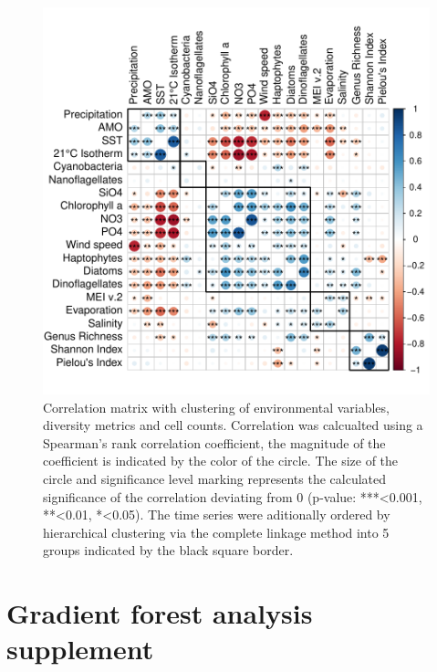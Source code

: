 \documentclass[draft]{agujournal2019}
\begin{document}
\begin{figure}[h!]
\noindent\includegraphics[width=\textwidth]{fig/CorrClustSupplementalPlot_v1.pdf}
\caption{Correlation matrix with clustering of environmental variables, diversity metrics and cell counts. Correlation was calcualted using a Spearman's rank correlation coefficient, the magnitude of the coefficient is indicated by the color of the circle. The size of the circle and significance level marking represents the calculated significance of the correlation deviating from 0 (p-value: ***\textless0.001, **\textless0.01, *\textless0.05). The time series were aditionally ordered by hierarchical clustering via the complete linkage method into 5 groups indicated by the black square border.}
\label{fig:sup:correlation}
\end{figure}


\newpage
\section{Gradient forest analysis supplement}
\end{document}
